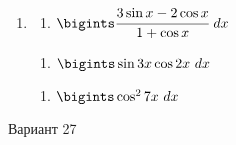 \documentclass{article}
\begin{document}
\begin{multicols}{2}
\begin{enumerate}[label=\Roman*.]
		\item
		\begin{multicols}{3}
			\begin{enumerate}[label=\arabic*.]
				\setlength\itemsep{1em}
				\item $\bigints\cfrac{3\sin x-2\cos x}{1+\cos x}\ dx$
			\end{enumerate}
			\vfill\null\columnbreak
			\begin{enumerate}[label=\arabic*., start=2]
				\setlength\itemsep{1em}
				\item $\bigints\sin 3x \cos 2x\ dx$
			\end{enumerate}
			\vfill\null\columnbreak
			\begin{enumerate}[label=\arabic*., start=3]
				\setlength\itemsep{1em}
				\item $\bigints\cos^2 7x\ dx$
			\end{enumerate}
			\vfill\null\columnbreak
		\end{multicols}
	\end{enumerate}
	
	\vfill\null\columnbreak
	
	\centerline{Вариант 27}
	

\end{multicols}
\end{document}
